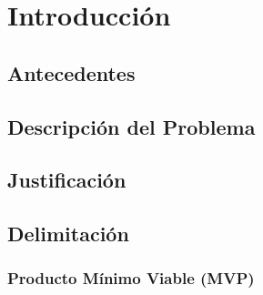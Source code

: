 \chapter{Introducción}

\section{Antecedentes}

\section{Descripción del Problema}

\section{Justificación}

\section{Delimitación}

\subsection{Producto Mínimo Viable (MVP)}

